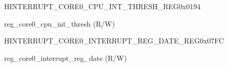 \begin{register}{H}{INTERRUPT\_CORE0\_CPU\_INT\_THRESH\_REG}{0x0194}\label{regdesc:INTERRUPTCORE0CPUINTTHRESHREG}
%
%
\regnewline%
\begin{regdesc}\begin{reglist}
\label{fielddesc:INTERRUPTCORE0CPUINTTHRESH}\item [INTERRUPT\_CORE0\_CPU\_INT\_THRESH] reg\_core0\_cpu\_int\_thresh (R/W)
\end{reglist}\end{regdesc}
\end{register}


\begin{register}{H}{INTERRUPT\_CORE0\_INTERRUPT\_REG\_DATE\_REG}{0x07FC}\label{regdesc:INTERRUPTCORE0INTERRUPTREGDATEREG}
%
%
\regnewline%
\begin{regdesc}\begin{reglist}
\label{fielddesc:INTERRUPTCORE0INTERRUPTREGDATE}\item [INTERRUPT\_CORE0\_INTERRUPT\_REG\_DATE] reg\_core0\_interrupt\_reg\_date (R/W)
\end{reglist}\end{regdesc}
\end{register}
